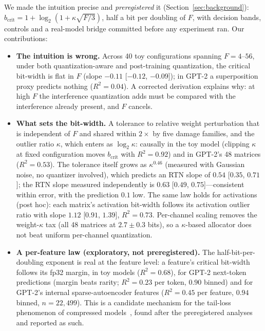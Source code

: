 \documentclass{article}
\begin{document}
We made the intuition precise and \emph{preregistered} it (Section~\ref{sec:background}): $b_{\mathrm{crit}} = 1 +
\log_2(1+\kappa\sqrt{F/3})$, half a bit per doubling of $F$, with decision bands, controls and a real-model bridge committed
before any experiment ran. Our contributions:
\begin{itemize}\setlength\itemsep{2pt}
\item \textbf{The intuition is wrong.} Across 40 toy configurations spanning $F = 4$--$56$, under both
quantization-aware and post-training quantization, the critical bit-width is flat in $F$ (slope $-0.11$
[$-0.12$, $-0.09$]); in GPT-2 a superposition proxy predicts nothing ($R^2=0.04$). A corrected derivation explains why:
at high $F$ the interference quantization adds must be compared with the interference already present, and $F$ cancels.
\item \textbf{What sets the bit-width.} A tolerance to relative weight perturbation that is independent of $F$ and
shared within $2\times$ by five damage families, and the outlier ratio $\kappa$, which enters as $\log_2\kappa$: causally
in the toy model (clipping $\kappa$ at fixed configuration moves $b_{\mathrm{crit}}$ with $R^2=0.92$) and in GPT-2's 48
matrices ($R^2=0.53$). The tolerance itself grows as $\kappa^{0.46}$ (measured with Gaussian noise, no quantizer involved), which predicts an
RTN slope of $0.54$ [$0.35$, $0.71$]; the RTN slope measured independently is $0.63$ [$0.49$, $0.75$]---consistent within
error, with the prediction $0.1$ low. The same law holds for
activations (post hoc): each matrix's activation bit-width follows its activation outlier ratio with slope $1.12$
[$0.91$, $1.39$], $R^2=0.73$. Per-channel scaling removes the weight-$\kappa$ tax (all 48 matrices at $2.7\pm0.3$ bits), so
a $\kappa$-based allocator does not beat uniform per-channel quantization.
\item \textbf{A per-feature law (exploratory, not preregistered).} The half-bit-per-doubling exponent is real at the
feature level: a feature's critical bit-width follows its fp32 margin, in toy models ($R^2=0.68$), for GPT-2 next-token
predictions (margin beats rarity; $R^2=0.23$ per token, $0.90$ binned) and for GPT-2's internal sparse-autoencoder
features ($R^2=0.45$ per feature, $0.94$ binned, $n=22{,}499$). This is a candidate mechanism for the tail-loss
phenomenon of compressed models~\cite{hooker2019,hooker2020}, found after the preregistered analyses and reported as such.
\end{itemize}
\end{document}
